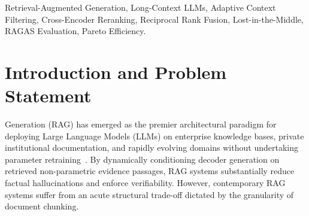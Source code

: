 \documentclass[lettersize,journal]{IEEEtran}
\begin{document}
\begin{IEEEkeywords}
Retrieval-Augmented Generation, Long-Context LLMs, Adaptive Context Filtering, Cross-Encoder Reranking, Reciprocal Rank Fusion, Lost-in-the-Middle, RAGAS Evaluation, Pareto Efficiency.
\end{IEEEkeywords}

\section{Introduction and Problem Statement}
 Generation (RAG) has emerged as the premier architectural paradigm for deploying Large Language Models (LLMs) on enterprise knowledge bases, private institutional documentation, and rapidly evolving domains without undertaking parameter retraining~\cite{longrag}. By dynamically conditioning decoder generation on retrieved non-parametric evidence passages, RAG systems substantially reduce factual hallucinations and enforce verifiability. However, contemporary RAG systems suffer from an acute structural trade-off dictated by the granularity of document chunking.
\end{document}
